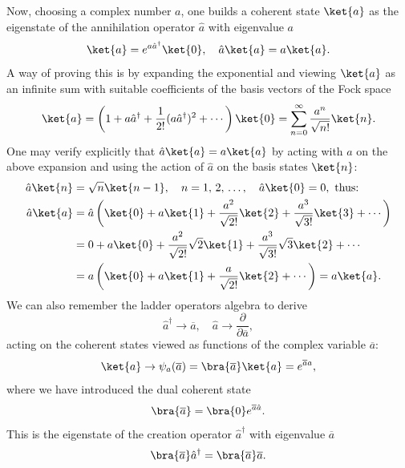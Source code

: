 Now, choosing a complex number \(a\), one builds a coherent state \(\ket{a}\) as the eigenstate of the annihilation operator \(\hat{a}\) with eigenvalue \(a\)
\begin{equation}
    \ket{a} = e^{a \hat{a}^{\dagger}} \ket{0}, \quad \hat{a} \ket{a} = a \ket{a}.
    \label{eq:bosonic_coherent_state_definition}
\end{equation}
A way of proving this is by expanding the exponential and viewing \(\ket{a}\) as an infinite sum with suitable coefficients of the basis vectors of the Fock space
\begin{equation}
    \ket{a} = \left( 1 + a \hat{a}^\dagger + \frac{1}{2!} (a\hat{a}^\dagger)^2 + \cdots \right)\ket{0} = \sum_{n=0}^{\infty} \frac{a^n}{\sqrt{n!}} \ket{n}.
    \label{eq:bosonic_coherent_state_expansion}
\end{equation}
One may verify explicitly that \(\hat{a} \ket{a} = a \ket{a}\) by acting with \(\hat{a}\) on the above expansion and using the action of \(\hat{a}\) on the basis states \(\ket{n}\):
\[
    \begin{aligned}
        \hat{a} \ket{n} & = \sqrt{n} \ket{n-1}, \quad n = 1,\,2,\,\dots, \quad \hat{a} \ket{0} = 0, \text{ thus:}                              \\
        \hat{a} \ket{a} & = \hat{a} \left( \ket{0} + a \ket{1} + \frac{a^2}{\sqrt{2!}}\ket{2} + \frac{a^3}{\sqrt{3!}} \ket{3} + \cdots \right) \\
                        & = 0 + a \ket{0} + \frac{a^2}{\sqrt{2!}} \sqrt{2} \ket{1} + \frac{a^3}{\sqrt{3!}} \sqrt{3} \ket{2} + \cdots           \\
                        & = a \left( \ket{0} + a \ket{1} + \frac{a}{\sqrt{2!}}\ket{2} + \cdots \right) = a \ket{a}.
    \end{aligned}
\]
We can also remember the ladder operators algebra to derive
\[
    \hat{a}^\dagger \rightarrow \overline{a}, \quad \hat{a} \rightarrow \frac{\partial}{\partial \overline{a}},
\]
acting on the coherent states viewed as functions of the complex variable \(\overline{a}\):
\[
    \ket{a} \rightarrow \psi_a(\overline{a}) = \bra{\overline{a}} \ket{a} = e^{\overline{a} a},
\]
where we have introduced the dual coherent state
\begin{equation}
    \bra{\overline{a}} = \bra{0} e^{\overline{a} \hat{a}}.
    \label{eq:bosonic_dual_coherent_state_definition}
\end{equation}
This is the eigenstate of the creation operator \(\hat{a}^\dagger\) with eigenvalue \(\overline{a}\)
\[
    \bra{\overline{a}} \hat{a}^\dagger = \bra{\overline{a}} \overline{a}.
\]

